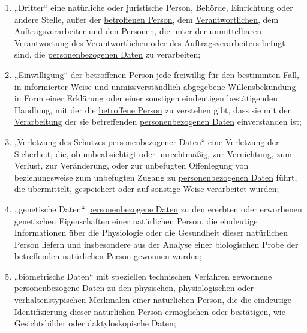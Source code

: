 \begin{enumerate}
  \item „Dritter“ eine natürliche oder juristische Person, Behörde, Einrichtung oder andere Stelle, außer der
   \hyperref[itm:04-1]{betroffenen Person}, dem \hyperref[itm:04-7]{Verantwortlichen}, dem \hyperref[itm:04-8]
    {Auftragsverarbeiter} und den Personen, die unter der unmittelbaren Verantwortung des \hyperref[itm:04-7]
    {Verantwortlichen} oder des \hyperref[itm:04-8]{Auftragsverarbeiters} befugt sind, die \hyperref[itm:04-1]
    {personenbezogenen Daten} zu verarbeiten;
  \label{itm:04-10}

  \item „Einwilligung“ der \hyperref[itm:04-1]{betroffenen Person} jede freiwillig für den bestimmten Fall, in
   informierter Weise und unmissverständlich abgegebene Willensbekundung in Form einer Erklärung oder einer sonstigen
   eindeutigen bestätigenden Handlung, mit der die \hyperref[itm:04-1]{betroffene Person} zu verstehen gibt, dass sie
   mit der \hyperref[itm:04-2]{Verarbeitung} der sie betreffenden \hyperref[itm:04-1]{personenbezogenen Daten}
   einverstanden ist;
  \label{itm:04-11}

  \item „Verletzung des Schutzes personenbezogener Daten“ eine Verletzung der Sicherheit, die, ob unbeabsichtigt oder
   unrechtmäßig, zur Vernichtung, zum Verlust, zur Veränderung, oder zur unbefugten Offenlegung von beziehungsweise zum
   unbefugten Zugang zu \hyperref[itm:04-1]{personenbezogenen Daten} führt, die übermittelt, gespeichert oder auf
   sonstige Weise verarbeitet wurden;
  \label{itm:04-12}

  \item „genetische Daten“ \hyperref[itm:04-1]{personenbezogene Daten} zu den ererbten oder erworbenen genetischen
   Eigenschaften einer natürlichen Person, die eindeutige Informationen über die Physiologie oder die Gesundheit dieser
   natürlichen Person liefern und insbesondere aus der Analyse einer biologischen Probe der betreffenden natürlichen
   Person gewonnen wurden;
  \label{itm:04-13}

  \item „biometrische Daten“ mit speziellen technischen Verfahren gewonnene \hyperref[itm:04-1]{personenbezogene Daten}
   zu den physischen, physiologischen oder verhaltenstypischen Merkmalen einer natürlichen Person, die die eindeutige
   Identifizierung dieser natürlichen Person ermöglichen oder bestätigen, wie Gesichtsbilder oder daktyloskopische
   Daten;
  \label{itm:04-14}


\end{enumerate}
